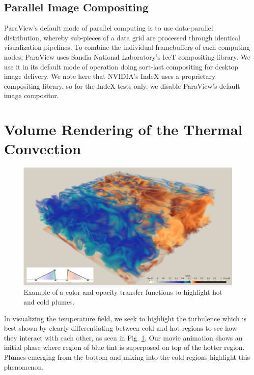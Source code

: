 \documentclass[5p,times]{elsarticle}
\begin{document}
\subsection{Parallel Image Compositing}

ParaView's default mode of parallel computing is to use data-parallel distribution,
whereby sub-pieces of a data grid are processed through identical visualization
pipelines. To combine the individual framebuffers of each computing nodes,
ParaView uses Sandia National Laboratory's IceT \cite{MorelandKPH11} compositing
library. We use it in its default mode of operation doing sort-last compositing
for desktop image delivery. We note here that NVIDIA's IndeX uses a proprietary
compositing library, so for the IndeX tests only, we disable ParaView's default
image compositor.

\section{Volume Rendering of the Thermal Convection}

\begin{figure}[!hbt]
	\centering
	\includegraphics[width=\linewidth]{zoom0000.pdf}%
	\caption{\label{fig:zoom} Example of a color and opacity transfer functions to highlight hot and cold plumes.}
\end{figure}


In visualizing the temperature field, we seek to highlight the turbulence which
is best shown by clearly differentiating between cold and hot regions to see how
they interact with each other, as seen in Fig. \ref{fig:zoom}. Our movie animation
shows an initial phase where region of blue tint is superposed on top of the hotter
region. Plumes emerging from the bottom and mixing into the cold regions highlight
this phenomenon.
\end{document}
